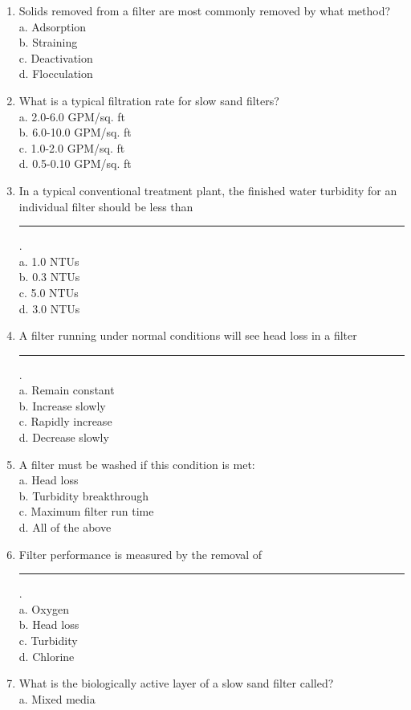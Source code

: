 \begin{enumerate}
\item Solids removed from a filter are most commonly removed by what method?\\
a.	Adsorption\\
b.	Straining\\
c.	Deactivation\\
d.	Flocculation\\
\item What is a typical filtration rate for slow sand filters?\\
a.	2.0-6.0 GPM/sq. ft\\
b.	6.0-10.0 GPM/sq. ft\\
c.	1.0-2.0 GPM/sq. ft\\
d.	0.5-0.10 GPM/sq. ft\\
\item In a typical conventional treatment plant, the finished water turbidity for an individual filter should be less than \rule{1.5cm}{0.5pt}.\\
a.	1.0 NTUs\\
b.	0.3 NTUs\\
c.	5.0 NTUs\\
d.	3.0 NTUs\\
\item A filter running under normal conditions will see head loss in a filter \rule{1.5cm}{0.5pt}.\\
a.	Remain constant\\
b.	Increase slowly\\
c.	Rapidly increase\\
d.	Decrease slowly\\
\item A filter must be washed if this condition is met:\\
a.	Head loss\\
b.	Turbidity breakthrough\\
c.	Maximum filter run time\\
d.	All of the above\\
\item Filter performance is measured by the removal of \rule{1.5cm}{0.5pt}.\\
a.	Oxygen\\
b.	Head loss\\
c.	Turbidity\\
d.	Chlorine\\
\item What is the biologically active layer of a slow sand filter called?\\
a.	Mixed media\\

\end{enumerate}
